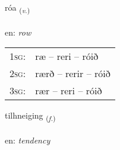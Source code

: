 \documentclass[frontgrid, backgrid]{flacards}\usepackage[]{graphicx}\usepackage[]{xcolor}
\begin{document}
\renewcommand{\flhead}{\vskip5pt \fboxsep=0pt {\small\bfseries\footnotesize Sagnorð | Verb}}
\renewcommand{\fcfoot}{\vskip5pt \fboxsep=0pt \hspace{2pt}{\small\bfseries\footnotesize 3K}}

\renewcommand{\blhead}{\vskip5pt {\small\bfseries\footnotesize Sagnorð | Verb }}
\renewcommand{\bcfoot}{\vskip5pt \hspace{2pt}{\small\bfseries\footnotesize 3K}}


{róa \small{\textsubscript{(\textit{v.})}} \\[1ex] %
\textphonetic{[rouːa]} \\
en: \emph{row} \\  [2ex]
\renewcommand*{\arraystretch}{0.8}
\begin{tabular}{p{1cm}l}
\textsc{1sg}: & ræ -- reri -- róið \\ 
\textsc{2sg}: & rærð -- rerir -- róið \\ 
\textsc{3sg}: & rær -- reri -- róið \\ 
\end{tabular}
}

\renewcommand{\flhead}{\vskip5pt \fboxsep=0pt {\small\bfseries\footnotesize Nafnorð | Noun}}
\renewcommand{\fcfoot}{\vskip5pt \fboxsep=0pt \hspace{2pt}{\small\bfseries\footnotesize 3K}}

\renewcommand{\blhead}{\vskip5pt {\small\bfseries\footnotesize Nafnorð | Noun }}
\renewcommand{\bcfoot}{\vskip5pt \hspace{2pt}{\small\bfseries\footnotesize 3K}}


{tilhneiging \small{\textsubscript{(\textit{f.})}} \\[1ex] %
 \\
en: \emph{tendency} \\  [2ex]
\renewcommand*{\arraystretch}{0.8}
}
\end{document}

